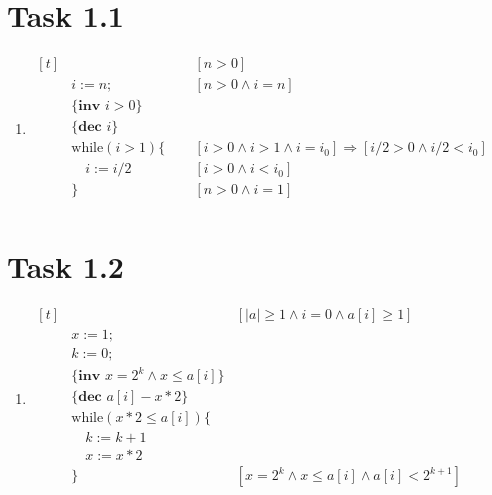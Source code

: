 \documentclass{article}
\author{\hmwkAuthorName}
\date{}
\newcommand{\answer}{\item[]} %
\begin{document}
	
	
	\section{Task 1.1}
	
		\begin{enumerate}[label={(\alph*)}]
			
			\answer
			$\begin{aligned}[t]
				& \qquad \qquad \qquad \qquad &[n > 0] \\
				&i := n; &[n > 0 \land i = n]\\
				&\{\textbf{inv } i > 0 \} \\
				&\{\textbf{dec } i \} \\
				&\text{while}(i > 1)\{ &[i > 0 \land i > 1 \land i = i_{0}] \Rightarrow [i/2 > 0 \land i / 2 < i_{0}]\\
				&\quad i := i / 2 &[i > 0 \land i < i_{0}]\\
				&\} &[n > 0 \land i = 1] \\
			\end{aligned}$
			
		\end{enumerate}
	
	\section{Task 1.2}
	
	\begin{enumerate}[label={(\alph*)}]
		
		\answer
		$\begin{aligned}[t]
			&\qquad \qquad \qquad \qquad &[|a| \geq 1 \land i = 0 \land a[i] \geq 1] \\
			&x := 1; \\
			&k := 0; \\
			&\{\textbf{inv } x = 2^k \land x \leq a[i] \} \\
			&\{\textbf{dec } a[i] - x * 2 \} \\
			&\text{while}(x * 2 \leq a[i]) \{ \\
			&\quad k := k + 1 \\
			&\quad x := x * 2 \\
			&\} &[x = 2^k \land x \leq a[i] \land a[i] < 2^{k+1}] \\
		\end{aligned}$
		
	\end{enumerate}
	
\end{document}
